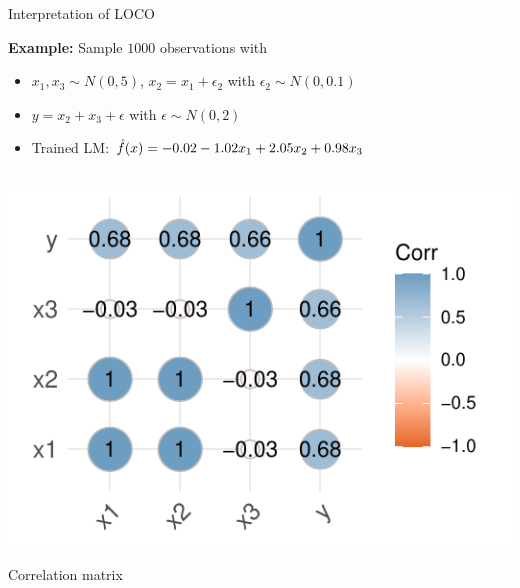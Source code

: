 \documentclass[10pt,compress,t,notes=noshow, xcolor=table]{beamer}
\begin{document}
\begin{frame}{Interpretation of LOCO}




\textbf{Example:} Sample $1000$ observations with
\begin{itemize}
    \item $x_1, x_3 \sim N(0, 5)$,  $x_2 = x_1 + \epsilon_2$ with $\epsilon_2 \sim N(0, 0.1)$
    \item $y = x_2 + x_3 + \epsilon$ with $\epsilon \sim N(0, 2)$
    \item Trained LM: $\hat{f}(x) = -0.02 - 1.02 x_1 + 2.05 x_2 + 0.98 x_3$
\end{itemize}


\pause

\begin{columns}[c, totalwidth=\textwidth]
\begin{column}{0.42\textwidth}
\includegraphics[width=\linewidth]{figure_man/simulation_loco_corr.pdf}\\
\centerline{Correlation matrix}


\end{column}
\end{columns}
\end{frame}
\end{document}
